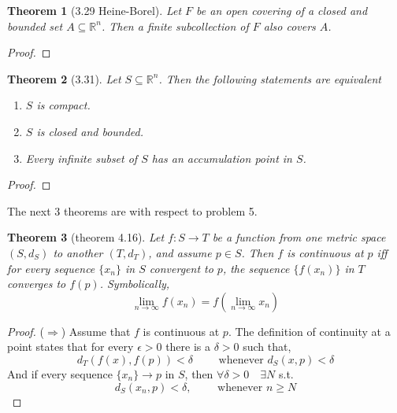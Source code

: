 \documentclass[aps,pra,notitlepage,amsmath,amssymb,letterpaper,12pt]{revtex4-1}
\newtheorem{theorem}{Theorem}
\begin{document}
\begin{theorem}[3.29 Heine-Borel]
Let $F$ be an open covering of a closed and bounded set $A \subseteq \mathbb{R}^n$. Then a finite subcollection of $F$ also covers $A$.
\end{theorem}

\begin{proof}
\end{proof}


\begin{theorem}[3.31]
Let $S \subseteq \mathbb{R}^n$. Then the following statements are equivalent
\begin{enumerate}[\upshape a)]
  \item $S$ is compact. %
  \item $S$ is closed and bounded.
  \item Every infinite subset of $S$ has an accumulation point in $S$.
\end{enumerate}
\end{theorem}

\begin{proof}
\end{proof}


The next 3 theorems are with respect to problem 5.
\begin{theorem}[theorem 4.16]
Let $f:S \to T$  be a function from one metric space $(S,d_{S})$ to another $(T,d_{T})$, and assume $p \in S$. Then $f$ is continuous at $p$ iff for every sequence $\{x_{n}\}$ in $S$ convergent to $p$, the sequence $\{f(x_{n})\}$ in $T$ converges to $f(p)$. Symbolically,
\[\lim_{n \to \infty} f(x_{n}) = f(\lim_{n \to \infty} x_{n})\]
\end{theorem}
\begin{proof}
($\Longrightarrow$) Assume that $f$ is continuous at $p$. The definition of continuity at a point states that for every $\epsilon > 0$ there is a $\delta >0$ such that,
\[d_{T}(f(x),f(p)) < \delta \qquad \textrm{  whenever  } d_{S}(x,p) < \delta\]
And if every sequence $\{x_{n}\} \rightarrow p$ in $S$, then  $\forall \delta > 0 \quad \exists N$ s.t. $$d_{S}(x_{n},p) < \delta, \qquad \textrm{ whenever } n \geq N$$
\end{proof}
\end{document}
